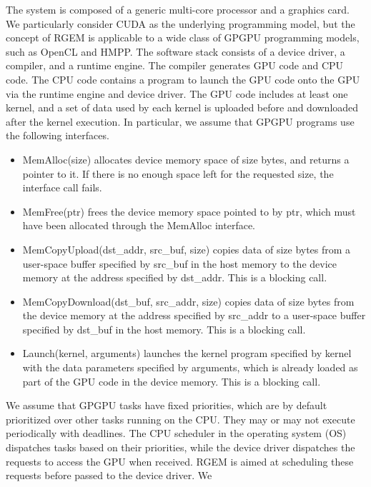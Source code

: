 The system is composed of a generic multi-core processor and a graphics
card.
We particularly consider CUDA as the underlying programming model, but
the concept of RGEM is applicable to a wide class of GPGPU
programming models, such as OpenCL and HMPP.
The software stack consists of a device driver, a compiler, and a
runtime engine.
The compiler generates GPU code and CPU code.
The CPU code contains a program to launch the GPU code onto the GPU via
the runtime engine and device driver.
The GPU code includes at least one kernel, and a set of data used by
each kernel is uploaded before and downloaded after the kernel execution.
In particular, we assume that GPGPU programs use the following
interfaces.

\begin{itemize}
 \item {\sf MemAlloc(size)} allocates device memory space of {\sf size}
       bytes, and returns a pointer to it.
       If there is no enough space left for the requested size, the
       interface call fails.
 \item \vspace{-0.5em} {\sf MemFree(ptr)} frees the device memory space
       pointed to by {\sf ptr}, which must have been allocated through
       the {\sf MemAlloc} interface.
 \item \vspace{-0.5em} {\sf MemCopyUpload(dst\_addr, src\_buf, size)}
       copies data of {\sf size} bytes from a user-space buffer
       specified by {\sf src\_buf} in the host memory to the device
       memory at the address specified by {\sf dst\_addr}.
       This is a blocking call.
 \item \vspace{-0.5em} {\sf MemCopyDownload(dst\_buf, src\_addr, size)}
       copies data of {\sf size} bytes from the device memory at the
       address specified by {\sf src\_addr} to a user-space buffer
       specified by {\sf dst\_buf} in the host memory.
       This is a blocking call.
 \item \vspace{-0.5em} {\sf Launch(kernel, arguments)} launches the
       kernel program specified by {\sf kernel} with the data parameters
       specified by {\sf arguments}, which is already loaded as part of
       the GPU code in the device memory.
       This is a blocking call.
\end{itemize}

We assume that GPGPU tasks have fixed priorities, which are by default
prioritized over other tasks running on the CPU.
They may or may not execute periodically with deadlines.
The CPU scheduler in the operating system (OS) dispatches tasks
based on their priorities, while the device driver dispatches the
requests to access the GPU when received.
RGEM is aimed at scheduling these requests before passed to the device
driver.
We

